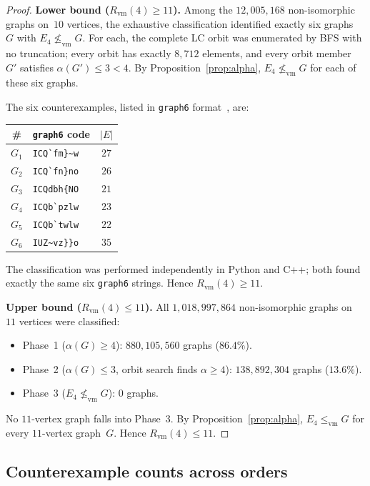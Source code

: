 \documentclass[11pt]{amsart}
\theoremstyle{definition}
\theoremstyle{remark}
\newcommand{\Rvm}{R_{\mathrm{vm}}}
\newcommand{\vm}{\leq_{\mathrm{vm}}}
\begin{document}
\begin{proof}
  \textbf{Lower bound ($\Rvm(4)\geq 11$).}
  Among the $12{,}005{,}168$ non-isomorphic graphs on~$10$ vertices,
  the exhaustive classification identified exactly six graphs~$G$ with
  $E_4\not\vm G$.  For each, the complete LC orbit was enumerated by BFS
  with no truncation; every orbit has exactly $8{,}712$ elements, and
  every orbit member~$G'$ satisfies $\alpha(G')\leq 3<4$.  By
  Proposition~\ref{prop:alpha}, $E_4\not\vm G$ for each of these six
  graphs.

  The six counterexamples, listed in \texttt{graph6}
  format~\cite{McKayPiperno2014}, are:
  \begin{center}
    \begin{tabular}{clc}
      \toprule
      \# & \texttt{graph6} code & $|E|$ \\
      \midrule
      $G_1$ & \verb|ICQ`fm}~w| & $27$ \\
      $G_2$ & \verb|ICQ`fn}no| & $26$ \\
      $G_3$ & \verb|ICQdbh{NO| & $21$ \\
      $G_4$ & \verb|ICQb`pzlw| & $23$ \\
      $G_5$ & \verb|ICQb`twlw| & $22$ \\
      $G_6$ & \verb|IUZ~vz}}o| & $35$ \\
      \bottomrule
    \end{tabular}
  \end{center}
  The classification was performed independently in Python and C++; both
  found exactly the same six \texttt{graph6} strings.  Hence
  $\Rvm(4)\geq 11$.

  \smallskip
  \textbf{Upper bound ($\Rvm(4)\leq 11$).}
  All $1{,}018{,}997{,}864$ non-isomorphic graphs on~$11$ vertices were
  classified:
  \begin{itemize}
    \item Phase~1 ($\alpha(G)\geq 4$):
      $880{,}105{,}560$ graphs ($86.4\%$).
    \item Phase~2 ($\alpha(G)\leq 3$, orbit search finds $\alpha\geq 4$):
      $138{,}892{,}304$ graphs ($13.6\%$).
    \item Phase~3 ($E_4\not\vm G$): $0$ graphs.
  \end{itemize}
  No $11$-vertex graph falls into Phase~3.  By
  Proposition~\ref{prop:alpha}, $E_4\vm G$ for every $11$-vertex
  graph~$G$.  Hence $\Rvm(4)\leq 11$.
\end{proof}


\subsection{Counterexample counts across orders}
\end{document}

